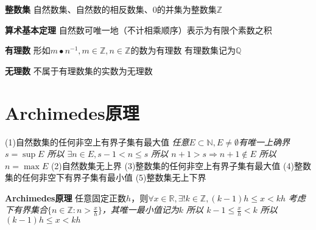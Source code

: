 \documentclass[11pt]{article}
\begin{document}
\textbf{整数集}
\newline
自然数集、自然数的相反数集、0的并集为整数集$\mathbb{Z}$
\newline

\textbf{算术基本定理}
\newline
自然数可唯一地（不计相乘顺序）表示为有限个素数之积
\newline

\textbf{有理数}
\newline
形如$m\bullet n^{-1}, m\in \mathbb{Z}, n\in \mathbb{Z}$的数为有理数
\newline
有理数集记为$\mathbb{Q}$
\newline

\textbf{无理数}
\newline
不属于有理数集的实数为无理数

\section{Archimedes原理}
(1)自然数集的任何非空上有界子集有最大值
\newline
\textit{任意$E\subset\mathbb{N}, E\not =\emptyset$有唯一上确界$s=\sup E$
\newline
所以 $\exists n\in E, s-1<n\le s$
\newline
所以 $n+1>s\Rightarrow n+1\notin E$
\newline
所以 $n=\max E$}
\newline
(2)自然数集无上界
\newline
(3)整数集的任何非空上有界子集有最大值
\newline
(4)整数集的任何非空下有界子集有最小值
\newline
(5)整数集无上下界
\newline

\textbf{Archimedes原理}
\newline
任意固定正数$h$，则$\forall x\in\mathbb{R}, \exists! k\in\mathbb{Z}, (k-1)h\le x<kh$
\newline
\textit{考虑下有界集合$\{n\in\mathbb{Z}:n>\frac{x}{h}\}$，其唯一最小值记为$k$
\newline
所以 $k-1\le\frac{x}{h}<k$
\newline
所以 $(k-1)h\le x<kh$}
\newline
\end{document}

